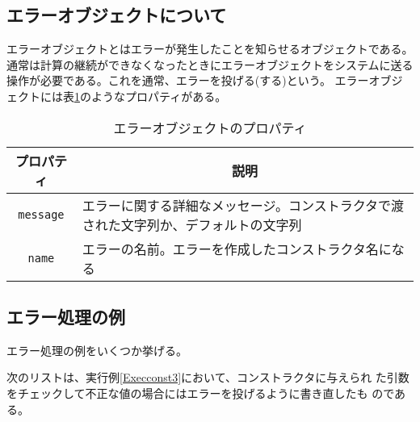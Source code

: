 \begin{Exec}
 \section{エラーオブジェクトについて}
エラーオブジェクトとはエラーが発生したことを知らせるオブジェクトである。
通常は計算の継続ができなくなったときにエラーオブジェクトをシステムに送る
操作が必要である。これを通常、エラーを投げる(する)という。
エラーオブジェクトには表\ref{ErrorProp}のようなプロパティがある。
\begin{table}
 \caption{エラーオブジェクトのプロパティ}\label{ErrorProp}
 \begin{center}
	 \begin{tabular}{|c|m{}|}\hline
		プロパティ&\multicolumn{1}{c|}{説明}\\ \hline
		\texttt{message}&エラーに関する詳細なメッセージ。コンストラクタで渡
				された文字列か、デフォルトの文字列\\ \hline
		\texttt{name}&エラーの名前。エラーを作成したコンストラクタ名になる\\ \hline

	\end{tabular}
 \end{center}
\end{table}
\subsection{エラー処理の例}
エラー処理の例をいくつか挙げる。
 \begin{Exec}\upshape\label{throwError}
	次のリストは、実行例\ref{Execconst3}において、コンストラクタに与えられ
	た引数をチェックして不正な値の場合にはエラーを投げるように書き直したも
	のである。


\end{Exec}
\end{Exec}
